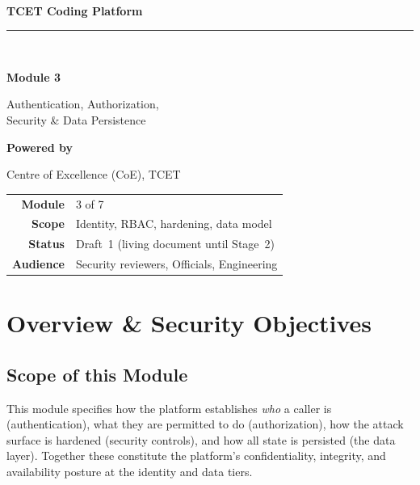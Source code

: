 \documentclass[12pt,a4paper,oneside]{report}
\begin{document}
\begin{titlepage}\centering
\vspace*{1.4cm}{\color{tcetaccent}\rule{\linewidth}{1.2pt}}\\[0.5cm]
{\LARGE\bfseries TCET Coding Platform\par}
{\color{tcetaccent}\rule{\linewidth}{1.2pt}}\\[1.4cm]
{\Huge\bfseries\color{tcetblue} Module 3\par}\vspace{0.3cm}
{\Huge Authentication, Authorization,\\[0.2cm] Security \& Data Persistence\par}\vspace{2.0cm}
{\large\bfseries Powered by\par}{\Large\color{tcetblue} Centre of Excellence (CoE), TCET\par}\vfill
\begin{tabular}{rl}\textbf{Module} & 3 of 7\\[3pt]
\textbf{Scope} & Identity, RBAC, hardening, data model\\[3pt]
\textbf{Status} & Draft~1 (living document until Stage~2)\\[3pt]
\textbf{Audience} & Security reviewers, Officials, Engineering\\\end{tabular}
\vspace{0.8cm}{\small\itshape \today\par}\end{titlepage}
\tableofcontents\clearpage{}

\chapter{Overview \& Security Objectives}
\section{Scope of this Module}
This module specifies how the platform establishes \emph{who} a caller is
(authentication), what they are permitted to do (authorization), how the attack
surface is hardened (security controls), and how all state is persisted (the data
layer). Together these constitute the platform's confidentiality, integrity, and
availability posture at the identity and data tiers.
\end{document}
